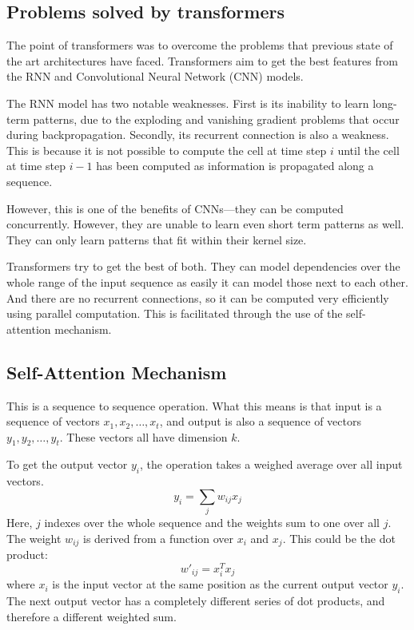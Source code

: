 \subsection{Problems solved by transformers}
The point of transformers was to overcome the problems that previous state of the art architectures have faced. Transformers aim to get the best features from the RNN and Convolutional Neural Network (CNN) models.

The RNN model has two notable weaknesses. First is its inability to learn long-term patterns, due to the exploding and vanishing gradient problems that occur during backpropagation.
Secondly, its recurrent connection is also a weakness. This is because it is not possible to compute the cell at time step $i$ until the cell at time step $i-1$ has been computed as information is propagated along a sequence.

However, this is one of the benefits of CNNs---they can be computed concurrently. However, they are unable to learn even short term patterns as well. They can only learn patterns that fit within their kernel size.

Transformers try to get the best of both.
They can model dependencies over the whole range of the input sequence as easily it can model those next to each other. And there are no recurrent connections, so it can be computed very efficiently using parallel computation. This is facilitated through the use of the self-attention mechanism.\cite{TransformersScratchPeterbloem}


\subsection{Self-Attention Mechanism}
This is a sequence to sequence operation. What this means is that input is a sequence of vectors $x_{1},x_{2},\ldots, x_{t}$, and output is also a sequence of vectors $y_{1},y_{2},\ldots, y_{t}$.
These vectors all have dimension $k$.

To get the output vector $y_{i}$, the operation takes a weighed average over all input vectors.
$$
y_{i}=\sum_{j}w_{ij}x_{j}
$$
Here, $j$ indexes over the whole sequence and the weights sum to one over all $j$.
The weight $w_{ij}$ is derived from a function over $x_{i}$ and $x_{j}$.
This could be the dot product:
$$
w'_{ij}=x_{i}^Tx_{j}
$$
where $x_{i}$ is the input vector at the same position as the current output vector $y_{i}$.
The next output vector has a completely different series of dot products, and therefore a different weighted sum.

